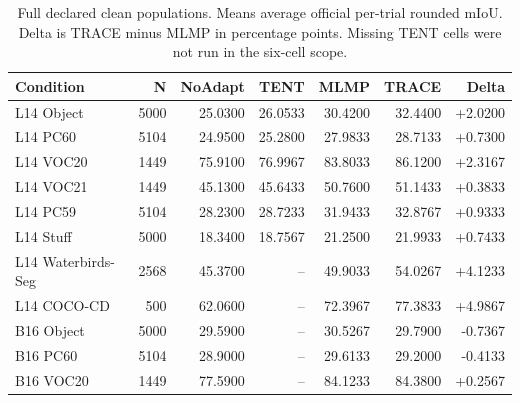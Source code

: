 \begin{table}[t]
\centering\small
\caption{Full declared clean populations. Means average official per-trial rounded mIoU. Delta is TRACE minus MLMP in percentage points. Missing TENT cells were not run in the six-cell scope.}
\label{tab:clean}
\setlength{\tabcolsep}{4pt}
\begin{tabular}{lrrrrrr}
\toprule
Condition & N & NoAdapt & TENT & MLMP & TRACE & Delta \\
\midrule
L14 Object & 5000 & 25.0300 & 26.0533 & 30.4200 & 32.4400 & +2.0200 \\
L14 PC60 & 5104 & 24.9500 & 25.2800 & 27.9833 & 28.7133 & +0.7300 \\
L14 VOC20 & 1449 & 75.9100 & 76.9967 & 83.8033 & 86.1200 & +2.3167 \\
L14 VOC21 & 1449 & 45.1300 & 45.6433 & 50.7600 & 51.1433 & +0.3833 \\
L14 PC59 & 5104 & 28.2300 & 28.7233 & 31.9433 & 32.8767 & +0.9333 \\
L14 Stuff & 5000 & 18.3400 & 18.7567 & 21.2500 & 21.9933 & +0.7433 \\
L14 Waterbirds-Seg & 2568 & 45.3700 & -- & 49.9033 & 54.0267 & +4.1233 \\
L14 COCO-CD & 500 & 62.0600 & -- & 72.3967 & 77.3833 & +4.9867 \\
\midrule
B16 Object & 5000 & 29.5900 & -- & 30.5267 & 29.7900 & -0.7367 \\
B16 PC60 & 5104 & 28.9000 & -- & 29.6133 & 29.2000 & -0.4133 \\
B16 VOC20 & 1449 & 77.5900 & -- & 84.1233 & 84.3800 & +0.2567 \\
\bottomrule
\end{tabular}
\end{table}
